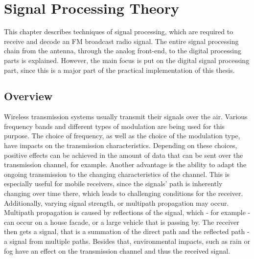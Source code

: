 \chapter{Signal Processing Theory}
\label{cha:SignalProcessingTheory}

This chapter describes techniques of signal processing, which are required to receive and decode an FM broadcast radio signal.
The entire signal processing chain from the antenna, through the analog front-end, to the digital processing parts is explained.
However, the main focus is put on the digital signal processing part, since this is a major part of the practical implementation of this thesis.

\section{Overview}

Wireless transmission systems usually transmit their signals over the air.
Various frequency bands and different types of modulation are being used for this purpose.
The choice of frequency, as well as the choice of the modulation type, have impacts on the transmission characteristics.
Depending on these choices, positive effects can be achieved in the amount of data that can be sent over the transmission channel, for example.
Another advantage is the ability to adapt the ongoing transmission to the changing characteristics of the channel.
This is especially useful for mobile receivers, since the signals' path is inherently changing over time there, which leads to challenging conditions for the receiver.
Additionally, varying signal strength, or multipath propagation may occur.
Multipath propagation is caused by reflections of the signal, which - for example - can occur on a house facade, or a large vehicle that is passing by.
The receiver then gets a signal, that is a summation of the direct path and the reflected path - a signal from multiple paths.
Besides that, environmental impacts, such as rain or fog have an effect on the transmission channel and thus the received signal.\\

